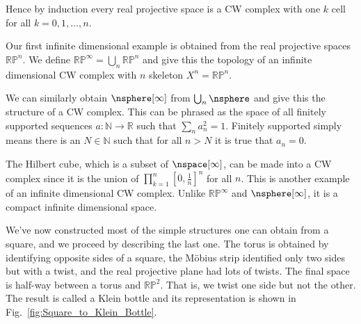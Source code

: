     Hence by induction every real projective space is a CW complex with
    one $k$ cell for all $k=0,1,\dots,n$.
    \begin{example}
        Our first infinite dimensional example is obtained from
        the real projective spaces $\mathbb{RP}^{n}$. We define
        $\mathbb{RP}^{\infty}=\bigcup_{n}\mathbb{RP}^{n}$ and give
        this the topology of an infinite dimensional CW complex with
        $n$ skeleton $X^{n}=\mathbb{RP}^{n}$.
    \end{example}
    \begin{example}
        We can similarly obtain $\nsphere[\infty]$ from
        $\bigcup_{n}\nsphere$ and give this the structure of a CW
        complex. This can be phrased as the space of all finitely
        supported sequences $a:\mathbb{N}\rightarrow\mathbb{R}$ such
        that $\sum_{n}a_{n}^{2}=1$. Finitely supported simply means
        there is an $N\in\mathbb{N}$ such that for all $n>N$ it is
        true that $a_{n}=0$.
    \end{example}
    \begin{example}
        The Hilbert cube, which is a subset of $\nspace[\infty]$, can
        be made into a CW complex since it is the union of
        $\prod_{k=1}^{n}[0,\frac{1}{n}]^{n}$ for all $n$. This is
        another example of an infinite dimensional CW complex. Unlike
        $\mathbb{RP}^{\infty}$ and $\nsphere[\infty]$, it is a compact
        infinite dimensional space.
    \end{example}
    \par
    \hfill
    \begin{minipage}[t]{0.54\textwidth}
        We've now constructed most of the simple structures one can
        obtain from a square, and we proceed by describing the last one.
        The torus is obtained by identifying opposite sides of a square,
        the M\"{o}bius strip identified only two sides but with
        a twist, and the real projective plane had lots of twists. The
        final space is half-way between a torus and $\mathbb{RP}^{2}$.
        That is, we twist one side but not the other. The result is
        called a Klein bottle and its representation is shown in
        Fig.~\ref{fig:Square_to_Klein_Bottle}.
    \end{minipage}
